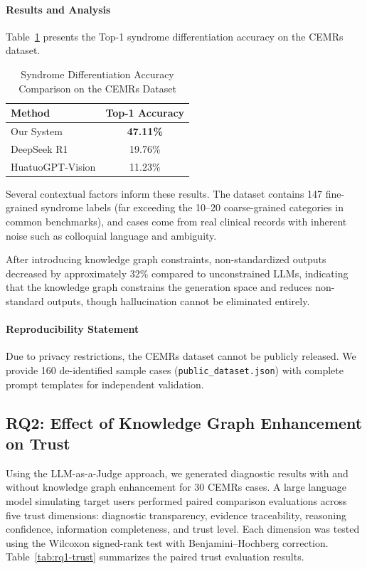 \paragraph{Results and Analysis}
Table~\ref{tab:accuracy-comparison} presents the Top-1 syndrome differentiation accuracy on the CEMRs dataset.

\begin{table}[pos=tbp]
  \centering
  \caption{Syndrome Differentiation Accuracy Comparison on the CEMRs Dataset}
  \label{tab:accuracy-comparison}
  \begin{tabular}{lc}
    \toprule
    \textbf{Method} & \textbf{Top-1 Accuracy} \\
    \midrule
    Our System & \textbf{47.11\%} \\
    DeepSeek R1 & 19.76\% \\
    HuatuoGPT-Vision & 11.23\% \\
    \bottomrule
  \end{tabular}
\end{table}

Several contextual factors inform these results.
The dataset contains 147 fine-grained syndrome labels (far exceeding the 10--20 coarse-grained categories in common benchmarks), and cases come from real clinical records with inherent noise such as colloquial language and ambiguity.

After introducing knowledge graph constraints, non-standardized outputs decreased by approximately 32\% compared to unconstrained LLMs, indicating that the knowledge graph constrains the generation space and reduces non-standard outputs, though hallucination cannot be eliminated entirely.

\paragraph{Reproducibility Statement}
Due to privacy restrictions, the CEMRs dataset cannot be publicly released. We provide 160 de-identified sample cases (\texttt{public\_dataset.json}) with complete prompt templates for independent validation.

\subsection{RQ2: Effect of Knowledge Graph Enhancement on Trust}\label{sec:eval-rq1-trust}

Using the LLM-as-a-Judge approach, we generated diagnostic results with and without knowledge graph enhancement for 30 CEMRs cases.
A large language model simulating target users performed paired comparison evaluations across five trust dimensions: diagnostic transparency, evidence traceability, reasoning confidence, information completeness, and trust level.
Each dimension was tested using the Wilcoxon signed-rank test with Benjamini--Hochberg correction.
Table~\ref{tab:rq1-trust} summarizes the paired trust evaluation results.

